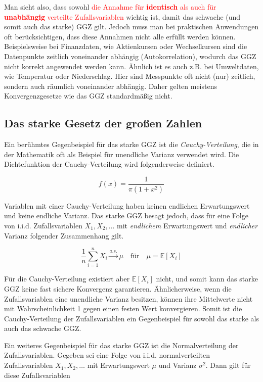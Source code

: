 \documentclass[aodsor,preprint]{imsart}
\numberwithin{equation}{section}
\theoremstyle{plain}
\begin{document}
Man sieht also, dass sowohl \textcolor{red}{die Annahme für \textbf{identisch} als auch für \textbf{unabhängig} verteilte Zufallsvariablen} wichtig ist, damit das schwache (und somit auch das starke) GGZ gilt.
Jedoch muss man bei praktischen Anwendungen oft berücksichtigen, dass diese Annahmen nicht alle erfüllt werden können.
Beispielsweise bei Finanzdaten, wie Aktienkursen oder Wechselkursen sind die Datenpunkte zeitlich voneinander abhängig (Autokorrelation), wodurch das GGZ nicht korrekt angewendet werden kann.
Ähnlich ist es auch z.B. bei Umweltdaten, wie Temperatur oder Niederschlag.
Hier sind Messpunkte oft nicht (nur) zeitlich, sondern auch räumlich voneinander abhängig.
Daher gelten meistens Konvergenzgesetze wie das GGZ standardmäßig nicht.


\subsection{Das starke Gesetz der großen Zahlen}


Ein berühmtes Gegenbeispiel für das starke GGZ ist die \textit{Cauchy-Verteilung}, die in der Mathematik oft als Beispiel für unendliche Varianz verwendet wird. Die Dichtefunktion der Cauchy-Verteilung wird folgenderweise definiert.

\[
f(x) = \frac{1}{\pi (1 + x^2)}
\]

Variablen mit einer Cauchy-Verteilung haben keinen endlichen Erwartungswert und keine endliche Varianz.
Das starke GGZ besagt jedoch, dass für eine Folge von i.i.d. Zufallsvariablen \( X_1, X_2, \dots \) mit \textit{endlichem} Erwartungswert und \textit{endlicher} Varianz folgender Zusammenhang gilt.

\[
\frac{1}{n} \sum_{i=1}^n X_i \xrightarrow{a.s.} \mu \quad \text{für} \quad \mu = \mathbb{E}[X_i]
\]

Für die Cauchy-Verteilung existiert aber \(\mathbb{E}[X_i]\) nicht, und somit kann das starke GGZ keine fast sichere Konvergenz garantieren.
Ähnlicherweise, wenn die Zufallsvariablen eine unendliche Varianz besitzen, können ihre Mittelwerte nicht mit Wahrscheinlichkeit 1 gegen einen festen Wert konvergieren.
Somit ist die Cauchy-Verteilung der Zufallsvariablen ein Gegenbeispiel für sowohl das starke als auch das schwache GGZ.


Ein weiteres Gegenbeispiel für das starke GGZ ist die Normalverteilung der Zufallsvariablen. Gegeben sei eine Folge von i.i.d. normalverteilten Zufallsvariablen \( X_1, X_2, \dots \) mit Erwartungswert \(\mu\) und Varianz \(\sigma^2\). Dann gilt für diese Zufallsvariablen
\end{document}
